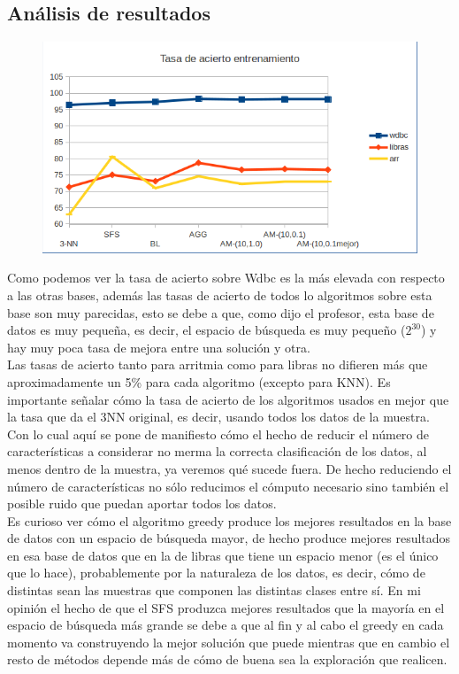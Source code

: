 \documentclass[10pt,a4paper]{article}
\begin{document}
\subsection{\color[rgb]{0.0,0.0,0.51}Análisis de resultados}


\begin{figure}[H]
\centering
\includegraphics[width=130mm]{tasa_train_am.png}
\end{figure}

Como podemos ver la tasa de acierto sobre Wdbc es la más elevada con respecto a las otras bases, además las tasas de acierto de todos lo algoritmos sobre esta base son muy parecidas, esto se debe a que, como dijo el profesor, esta base de datos es muy pequeña, es decir, el espacio de búsqueda es muy pequeño ($2^{30}$) y hay muy poca tasa de mejora entre una solución y otra.\\

Las tasas de acierto tanto para arritmia como para libras no difieren más que aproximadamente un 5\% para cada algoritmo (excepto para KNN). Es importante señalar cómo la tasa de acierto de los algoritmos usados en mejor que la tasa que da el 3NN original, es decir, usando todos los datos de la muestra. Con lo cual aquí se pone de manifiesto cómo el hecho de reducir el número de características a considerar no merma la correcta clasificación de los datos, al menos dentro de la muestra, ya veremos qué sucede fuera. De hecho reduciendo el número de características no sólo reducimos el cómputo necesario sino también el posible ruido que puedan aportar todos los datos.\\

Es curioso ver cómo el algoritmo greedy produce los mejores resultados en la base de datos con un espacio de búsqueda mayor, de hecho produce mejores resultados en esa base de datos que en la de libras que tiene un espacio menor (es el único que lo hace), probablemente por la naturaleza de los datos, es decir, cómo de distintas sean las muestras que componen las distintas clases entre sí. En mi opinión el hecho de que el SFS produzca mejores resultados que la mayoría en el espacio de búsqueda más grande se debe a que al fin y al cabo el greedy en cada momento va construyendo la mejor solución que puede mientras que en cambio el resto de métodos depende más de cómo de buena sea la exploración que realicen.\\
\end{document}
